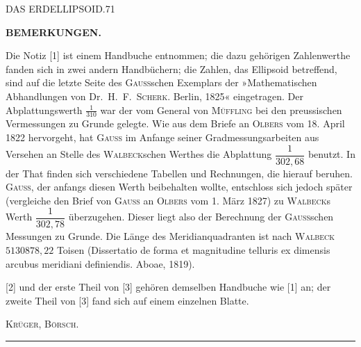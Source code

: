 \clearpage
\noindent\mbox{}\hfill DAS ERDELLIPSOID.\hfill 71\par
\vspace{12mm}
\begin{center}\textbf{BEMERKUNGEN.}\end{center}
{\small
Die Notiz [1] ist einem Handbuche entnommen; die dazu gehörigen Zahlenwerthe fanden sich in zwei andern Handbüchern; die Zahlen, das Ellipsoid betreffend, sind auf die letzte Seite des \textsc{Gauss}schen Exemplars der »Mathematischen Abhandlungen von Dr.\ H.\ F.\ \textsc{Scherk}. Berlin, 1825« eingetragen. Der Abplattungswerth $\tfrac1{310}$ war der vom General von \textsc{Müffling} bei den preussischen Vermessungen zu Grunde gelegte. Wie aus dem Briefe an \textsc{Olbers} vom 18. April 1822 hervorgeht, hat \textsc{Gauss} im Anfange seiner Gradmessungsarbeiten aus Versehen an Stelle des \textsc{Walbeck}schen Werthes die Abplattung $\dfrac1{302{,}68}$ benutzt. In der That finden sich verschiedene Tabellen und Rechnungen, die hierauf beruhen. \textsc{Gauss}, der anfangs diesen Werth beibehalten wollte, entschloss sich jedoch später (vergleiche den Brief von \textsc{Gauss} an \textsc{Olbers} vom 1. März 1827) zu \textsc{Walbeck}s Werth $\dfrac1{302{,}78}$ überzugehen. Dieser liegt also der Berechnung der \textsc{Gauss}schen Messungen zu Grunde. Die Länge des Meridianquadranten ist nach \textsc{Walbeck} $5130878{,}22$ Toisen (Dissertatio de forma et magnitudine telluris ex dimensis arcubus meridiani definiendis. Aboae, 1819).

[2] und der erste Theil von [3] gehören demselben Handbuche wie [1] an; der zweite Theil von [3] fand sich auf einem einzelnen Blatte.
\par\hfill\textsc{Krüger, Börsch.}\par
}
\begin{center}\rule{.25\textwidth}{.4pt}\end{center}
